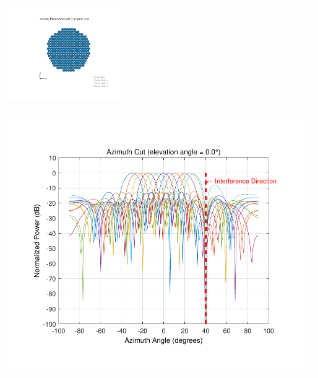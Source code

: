 \documentclass{ctexbeamer}
\begin{document}
\begin{frame}
\begin{figure}
        \includegraphics[width=3cm]{2-10.pdf}
    \end{figure}
\end{frame}

\begin{frame}
    \begin{figure}
        \includegraphics[width=8cm]{2-1.pdf}
    \end{figure}
\end{frame}
\end{document}
